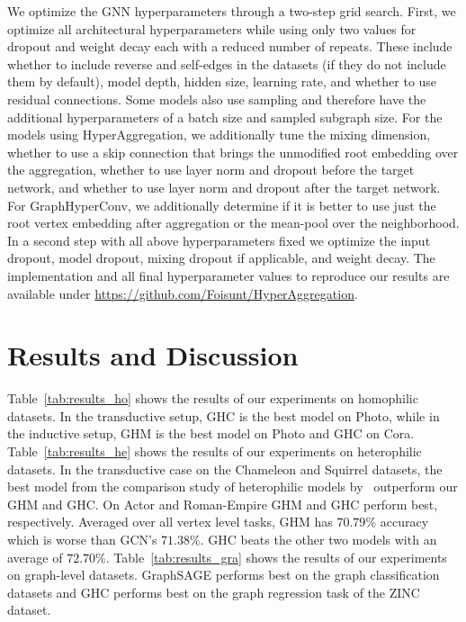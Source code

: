 \documentclass[conference]{IEEEtran}
\begin{document}
We optimize the GNN hyperparameters through a two-step grid search. 
First, we optimize all architectural hyperparameters while using only two values for dropout and weight decay each with a reduced number of repeats. 
These include whether to include reverse and self-edges in the datasets (if they do not include them by default), model depth, hidden size, learning rate, and whether to use residual connections.
Some models also use sampling and therefore have the additional hyperparameters of a batch size and sampled subgraph size.
For the models using HyperAggregation, we additionally tune the mixing dimension, whether to use a skip connection that brings the unmodified root embedding over the aggregation, whether to use layer norm and dropout before the target network, and whether to use layer norm and dropout after the target network.
For GraphHyperConv, we additionally determine if it is better to use just the root vertex embedding after aggregation or the mean-pool over the neighborhood.
In a second step with all above hyperparameters fixed we optimize the input dropout, model dropout, mixing dropout if applicable, and weight decay.
The implementation and all final hyperparameter values to reproduce our results are available under \url{https://github.com/Foisunt/HyperAggregation}.

\section{Results and Discussion}
\label{sec:res_disc}

Table~\ref{tab:results_ho} shows the results of our experiments on homophilic datasets. 
In the transductive setup, GHC is the best model on Photo, while in the inductive setup, GHM is the best model on Photo and GHC on Cora.
Table~\ref{tab:results_he} shows the results of our experiments on heterophilic datasets. 
In the transductive case on the Chameleon and Squirrel datasets, the best model from the comparison study of heterophilic models by~\citet{heter} outperform our GHM and GHC.
On Actor and Roman-Empire GHM and GHC perform best, respectively.
Averaged over all vertex level tasks, GHM has $ 70.79\%$ accuracy which is worse than GCN's $71.38\%$.
GHC beats the other two models with an average of $72.70\%$. 
Table~\ref{tab:results_gra} shows the results of our experiments on graph-level datasets.
GraphSAGE performs best on the graph classification datasets and GHC performs best on the graph regression task of the ZINC dataset.
\end{document}

